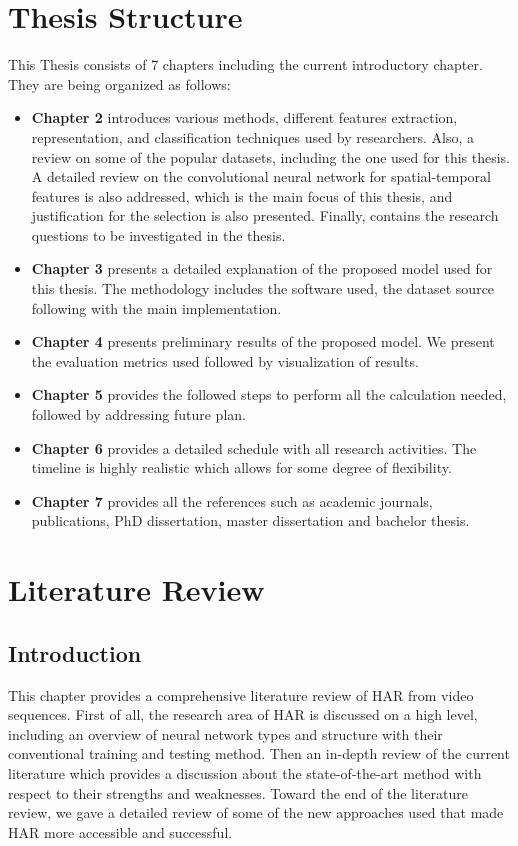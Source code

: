 \section{Thesis Structure}
\hspace{5mm} This Thesis consists of 7 chapters including the current introductory chapter. They are being organized as follows:\\
\begin{itemize}
\item \textbf{Chapter 2} introduces various methods, different features extraction, representation, and classification techniques used by researchers. Also, a review on some of the popular datasets, including the one used for this thesis. A detailed review on the convolutional neural network for spatial-temporal features is also addressed, which is the main focus of this thesis, and justification for the selection is also presented. Finally, contains the research questions to be investigated in the thesis.
\item \textbf{Chapter 3} presents a detailed explanation of the proposed model used for this thesis. The methodology includes the software used, the dataset source following with the main implementation.
\item \textbf{Chapter 4} presents preliminary results of the proposed model. We present the evaluation metrics used followed by visualization of results.
\item \textbf{Chapter 5} provides the followed steps to perform all the calculation needed, followed by addressing future plan. 
\item \textbf{Chapter 6} provides a detailed schedule with all research activities. The timeline is highly realistic which allows for some degree of flexibility.
\item \textbf{Chapter 7} provides all the references such as academic journals, publications, PhD dissertation, master dissertation and bachelor thesis.
\end{itemize}

\section{Literature Review}


\subsection{Introduction}
\hspace{5mm} This chapter provides a comprehensive literature review of HAR from video sequences. First of all, the research area of HAR is discussed on a high level, including an overview of neural network types and structure with their conventional training and testing method. Then an in-depth review of the current literature which provides a discussion about the state-of-the-art method with respect to their strengths and weaknesses. Toward the end of the literature review, we gave a detailed review of some of the new approaches used that made HAR more accessible and successful.

